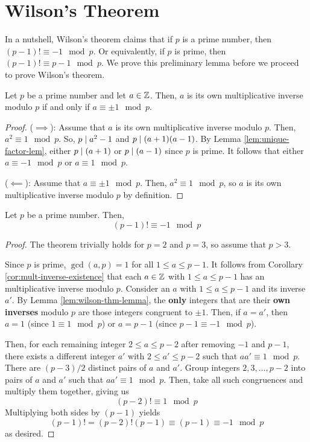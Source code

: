 \section{Wilson's Theorem}

In a nutshell, Wilson's theorem claims that if $p$ is a prime number, then $(p-1)! \equiv -1 \mod p$. Or equivalently, if $p$ is prime, then $(p-1)! \equiv p-1 \mod p$. We prove this preliminary lemma before we proceed to prove Wilson's theorem.

\begin{lemma} \label{lem:wilson-thm-lemma}
    Let $p$ be a prime number and let $a \in \mathbb{Z}$. Then, $a$ is its own multiplicative inverse modulo $p$ if and only if $a \equiv \pm 1 \mod p$.
\end{lemma}

\begin{proof}
    \hfill

    ($\implies$): Assume that $a$ is its own multiplicative inverse modulo $p$. Then, $a^2 \equiv 1 \mod p$. So, $p \mathrel{\mid} a^2 - 1$ and $p \mathrel{\mid} (a+1)(a-1)$. By Lemma \ref{lem:unique-factor-lem}, either $p \mathrel{\mid} (a+1)$ or $p \mathrel{\mid} (a-1)$ since $p$ is prime. It follows that either $a \equiv -1 \mod p$ or $a \equiv 1 \mod p$.

    ($\impliedby$): Assume that $a \equiv \pm 1 \mod p$. Then, $a^2 \equiv 1 \mod p$, so $a$ is its own multiplicative inverse modulo $p$ by definition.
\end{proof}

\begin{theorem}
    Let $p$ be a prime number. Then,
    $$
    (p-1)! \equiv -1 \mod p
    $$
\end{theorem}

\begin{proof}
    The theorem trivially holds for $p = 2$ and $p = 3$, so assume that $p > 3$.

    Since $p$ is prime, $\gcd(a,p) = 1$ for all $1 \leq a \leq p-1$. It follows from Corollary \ref{cor:mult-inverse-existence} that each $a \in \mathbb{Z}$ with $1 \leq a \leq p-1$ has an multiplicative inverse modulo $p$. Consider an $a$ with $1 \leq a \leq p-1$ and its inverse $a'$. By Lemma \ref{lem:wilson-thm-lemma}, the \textbf{only} integers that are their \textbf{own inverses} modulo $p$ are those integers congruent to $\pm 1$. Then, if $a = a'$, then $a = 1$ (since $1 \equiv 1 \mod p$) or $a = p-1$ (since $p-1 \equiv -1 \mod p$).

    Then, for each remaining integer $2 \leq a \leq p-2$ after removing $-1$ and $p-1$, there exists a different integer $a'$ with $2 \leq a' \leq p-2$ such that $aa' \equiv 1 \mod p$. There are $(p-3)/2$ distinct pairs of $a$ and $a'$. Group integers $2,3,\ldots,p-2$ into pairs of $a$ and $a'$ such that $aa' \equiv 1 \mod p$. Then, take all such congruences and multiply them together, giving us
    $$
    (p-2)! \equiv 1 \mod p
    $$
    Multiplying both sides by $(p-1)$ yields
    $$
    (p-1)! = (p-2)! (p-1) \equiv (p-1) \equiv -1 \mod p
    $$
    as desired.
\end{proof}

